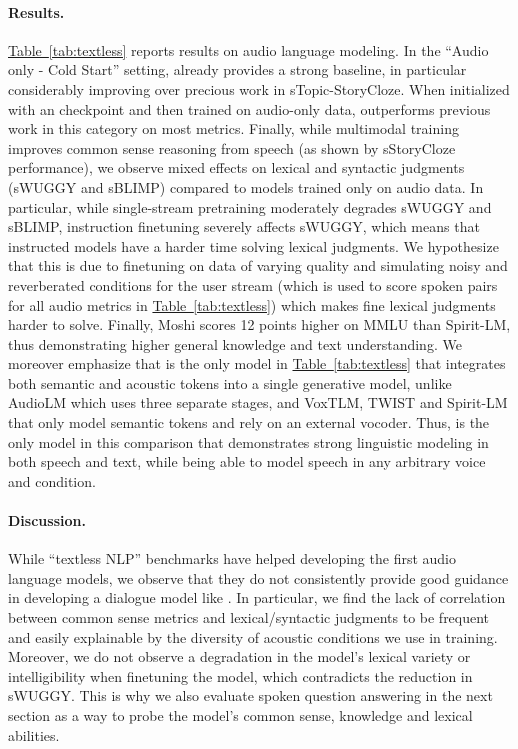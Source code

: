 \paragraph{Results.} \hyperref[tab:textless]{Table~\ref{tab:textless}} reports results on audio language modeling. In the ``Audio only - Cold Start'' setting, \ours{} already provides a strong baseline, in particular considerably improving over precious work in sTopic-StoryCloze.  When initialized with an \helium{} checkpoint and then trained on audio-only data, \ours{} outperforms previous work in this category on most metrics. Finally, while multimodal training improves common sense reasoning from speech (as shown by sStoryCloze performance), we observe mixed effects on lexical and syntactic judgments (sWUGGY and sBLIMP) compared to models trained only on audio data. In particular, while single-stream pretraining moderately degrades sWUGGY and sBLIMP, instruction finetuning severely affects sWUGGY, which means that instructed models have a harder time solving lexical judgments. 
We hypothesize that this is due to finetuning \ours{} on data of varying quality and simulating noisy and reverberated conditions for the user stream (which is used to score spoken pairs for all audio metrics in \hyperref[tab:textless]{Table~\ref{tab:textless}}) which makes fine lexical judgments harder to solve. Finally, Moshi scores 12 points higher on MMLU than Spirit-LM, thus demonstrating higher general knowledge and text understanding. We moreover emphasize that \ours{} is the only model in \hyperref[tab:textless]{Table~\ref{tab:textless}} that integrates both semantic and acoustic tokens into a single generative model, unlike AudioLM which uses three separate stages, and VoxTLM, TWIST and Spirit-LM that only model semantic tokens and rely on an external vocoder. Thus, \ours{} is the only model in this comparison that demonstrates strong linguistic modeling in both speech and text, while being able to model speech in any arbitrary voice and condition.

\paragraph{Discussion.}
While ``textless NLP'' benchmarks have helped developing the first audio language models, we observe that they do not consistently provide good guidance in developing a dialogue model like \ours{}. In particular, we find the lack of correlation between common sense metrics and lexical/syntactic judgments to be frequent and easily explainable by the diversity of acoustic conditions we use in training. Moreover, we do not observe a degradation in the model's lexical variety or intelligibility when finetuning the model, which contradicts the reduction in sWUGGY. This is why we also evaluate spoken question answering in the next section as a way to probe the model's common sense, knowledge and lexical abilities.

